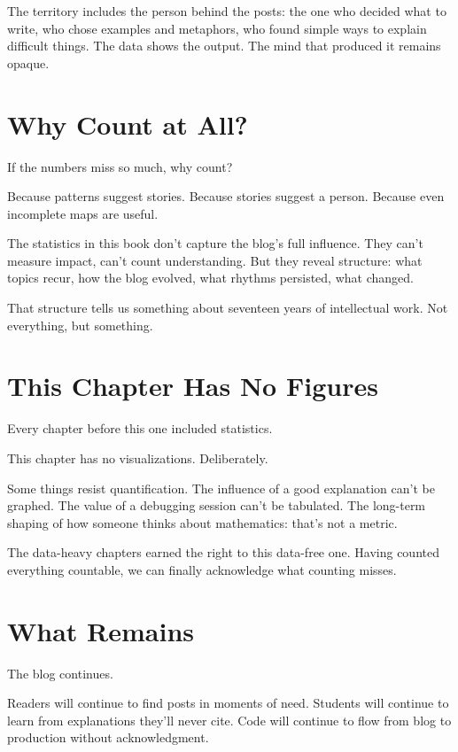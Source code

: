 The territory includes the person behind the posts: the one who decided what to write, who chose examples and metaphors, who found simple ways to explain difficult things. The data shows the output. The mind that produced it remains opaque.

\bigskip

\section*{Why Count at All?}

If the numbers miss so much, why count?

Because patterns suggest stories. Because stories suggest a person. Because even incomplete maps are useful.

The statistics in this book don't capture the blog's full influence. They can't measure impact, can't count understanding. But they reveal structure: what topics recur, how the blog evolved, what rhythms persisted, what changed.

That structure tells us something about seventeen years of intellectual work. Not everything, but something.

\bigskip

\section*{This Chapter Has No Figures}

Every chapter before this one included statistics.

This chapter has no visualizations. Deliberately.

Some things resist quantification. The influence of a good explanation can't be graphed. The value of a debugging session can't be tabulated. The long-term shaping of how someone thinks about mathematics: that's not a metric.

The data-heavy chapters earned the right to this data-free one. Having counted everything countable, we can finally acknowledge what counting misses.

\bigskip

\section*{What Remains}

The blog continues.

Readers will continue to find posts in moments of need. Students will continue to learn from explanations they'll never cite. Code will continue to flow from blog to production without acknowledgment.

